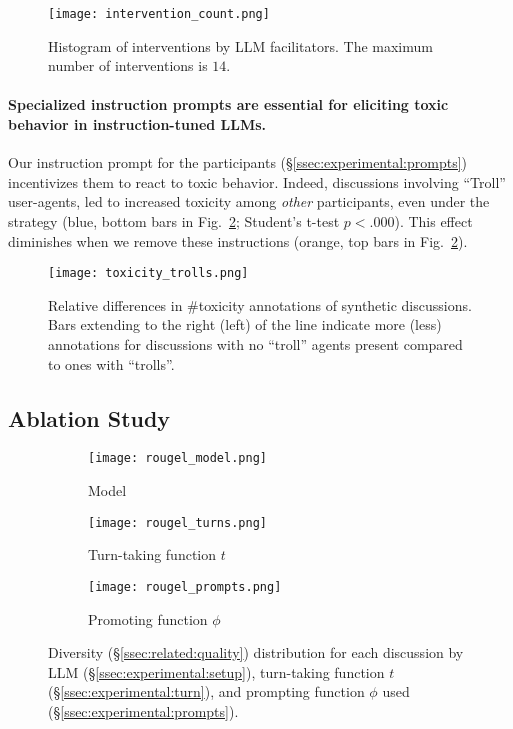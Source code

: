\begin{figure}[t]
	\centering
	\texttt{[image: intervention\_count.png]}
	\caption{Histogram of interventions by \ac{LLM} facilitators. The maximum number of interventions is $14$.}
	\label{fig:intervention_count}
\end{figure}

\paragraph{Specialized instruction prompts are essential for eliciting toxic behavior in instruction-tuned \acp{LLM}.} Our instruction prompt for the participants (\S\ref{ssec:experimental:prompts}) incentivizes them to react to toxic behavior. Indeed, discussions involving “Troll” user-agents, led to increased toxicity among \emph{other} participants, even under the \emph{\strategynoinstr} strategy (blue, bottom bars in Fig.~\ref{fig:toxicity_trolls}; Student's t-test $p < .000$). This effect diminishes when we remove these instructions (orange, top bars in Fig.~\ref{fig:toxicity_trolls}).

\begin{figure}[t]
    \centering
    \texttt{[image: toxicity\_trolls.png]}
    \caption{Relative differences in \#toxicity annotations of synthetic discussions. Bars extending to the right (left) of the line indicate more (less) annotations for discussions with no ``troll'' agents present compared to ones with ``trolls''.}
    \label{fig:toxicity_trolls}
\end{figure}


\subsection{Ablation Study}
\label{ssec:results:ablation}

\begin{figure*}[t]
    \begin{subfigure}{0.32\linewidth}
        \texttt{[image: rougel\_model.png]}
        \caption{Model}
        \label{fig:rougel_model}
    \end{subfigure}%
    \hfill
    \begin{subfigure}{0.32\linewidth}
        \texttt{[image: rougel\_turns.png]}
        \caption{Turn-taking function $t$}
        \label{fig:rougel_turns}
    \end{subfigure}%
    \hfill
    \begin{subfigure}{0.32\linewidth}
        \texttt{[image: rougel\_prompts.png]}
        \caption{Promoting function $\phi$}
        \label{fig:rougel_prompts}
    \end{subfigure}%

    \caption{Diversity (\S\ref{ssec:related:quality}) distribution for each discussion by \ac{LLM} (\S\ref{ssec:experimental:setup}), turn-taking function $t$ (\S\ref{ssec:experimental:turn}), and prompting function $\phi$ used (\S\ref{ssec:experimental:prompts}).}
    \label{fig:diversity}
\end{figure*}

